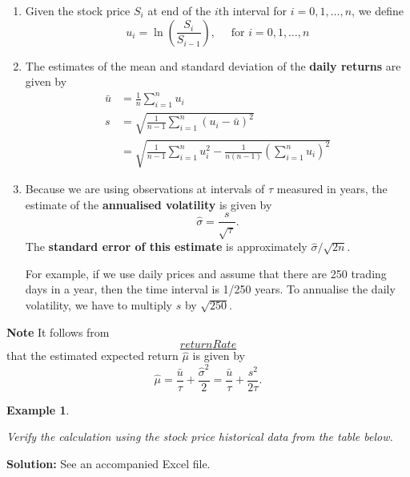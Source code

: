 \documentclass[
]{book}
\theoremstyle{definition}
\theoremstyle{definition}
\newtheorem{example}{Example}[chapter]
\theoremstyle{definition}
\theoremstyle{definition}
\theoremstyle{remark}
\begin{document}
\begin{enumerate}
\def\labelenumi{\arabic{enumi}.}
\item
  Given the stock price \(S_i\) at end of the \(i\)th interval for
  \(i = 0,1, \ldots, n\), we define
  \[u_i = \ln \left(\frac{S_i}{S_{i-1}} \right), \quad \text{ for } i = 0,1, \ldots, n\]
\item
  The estimates of the mean and standard deviation of the \textbf{daily
  returns} are given by \[\begin{aligned}
      \bar{u} &= \frac{1}{n} \sum_{i=1}^n u_i \\
      s &= \sqrt{\frac{1}{n-1} \sum_{i=1}^n (u_i - \bar{u})^2 } \\
          &= \sqrt{\frac{1}{n-1} \sum_{i=1}^n    u_i^2 - \frac{1}{n(n-1)}  \left(\sum_{i=1}^n u_i  \right)^2 }\end{aligned}\]
\item
  Because we are using observations at intervals of \(\tau\) measured in
  years, the estimate of the \textbf{annualised volatility} is given by
  \[\hat{\sigma} = \frac{s}{\sqrt{\tau}}.\] The \textbf{standard error of
  this estimate} is approximately \(\hat{\sigma}/\sqrt{2n}\).

  For example, if we use daily prices and assume that there are 250
  trading days in a year, then the time interval is 1/250 years. To
  annualise the daily volatility, we have to multiply \(s\) by
  \(\sqrt{250}\).
\end{enumerate}

\textbf{Note} It follows from
\protect\hyperlink{returnRate}{\[returnRate\]} that the estimated expected return \(\hat{\mu}\)
is given by
\[\hat{\mu}  =  \frac{\bar{u}}{\tau}  + \frac{\hat{\sigma}^2}{2} = \frac{\bar{u}}{\tau}  + \frac{s^2}{2\tau} .\]

\begin{example}
\protect\hypertarget{exm:unlabeled-div-82}{}\label{exm:unlabeled-div-82}

\emph{Verify the calculation using the stock price historical data from the
table below.}

\end{example}

\textbf{Solution:} See an accompanied Excel file.
\end{document}
